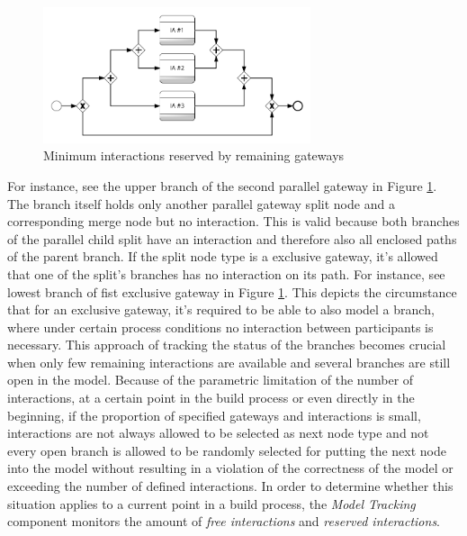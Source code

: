 \begin{figure}[htb]
\centering
\includegraphics[width=0.7\textwidth]{src/images/choreo_min.png}
\caption{Minimum interactions reserved by remaining gateways}
\label{fig:graphTracking4}
\end{figure}
\vspace{-0.1cm}
For instance, see the upper branch of the second parallel gateway in Figure \ref{fig:graphTracking4}. The branch itself holds only another parallel gateway split node and a corresponding merge node but no interaction. This is valid because both branches of the parallel child split have an interaction and therefore also all enclosed paths of the parent branch. If the split node type is a exclusive gateway, it's allowed that one of the split's branches has no interaction on its path. For instance, see lowest branch of fist exclusive gateway in Figure \ref{fig:graphTracking4}. This depicts the circumstance that for an exclusive gateway, it's required to be able to also model a branch, where under certain process conditions no interaction between participants is necessary. This approach of tracking the status of the branches becomes crucial when only few remaining interactions are available and several branches are still open in the model. Because of the parametric limitation of the number of interactions, at a certain point in the build process or even directly in the beginning, if the proportion of specified gateways and interactions is small, interactions are not always allowed to be selected as next node type and not every open branch is allowed to be randomly selected for putting the next node into the model without resulting in a violation of the correctness of the model or exceeding the number of defined interactions. In order to determine whether this situation applies to a current point in a build process, the \textit{Model Tracking} component monitors the amount of \textit{free interactions} and \textit{reserved interactions}. 


